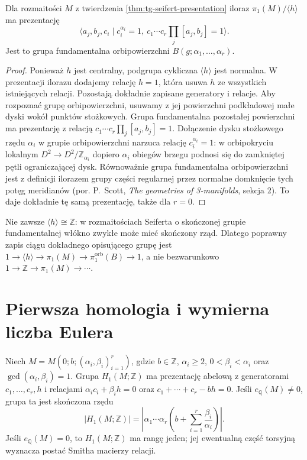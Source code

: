 \begin{wniosek}
Dla rozmaitości $M$ z twierdzenia
\ref{thm:tg-seifert-presentation} iloraz
$\pi_1(M)/\langle h\rangle$ ma prezentację
\[
\big\langle a_j,b_j,c_i\mid c_i^{\alpha_i}=1,
\ c_1\cdots c_r\prod_j[a_j,b_j]=1\big\rangle.
\]
Jest to grupa fundamentalna orbipowierzchni
$B(g;\alpha_1,\ldots,\alpha_r)$.
\end{wniosek}
\begin{proof}
Ponieważ $h$ jest centralny, podgrupa cykliczna
$\langle h\rangle$ jest normalna. W prezentacji
ilorazu dodajemy relację $h=1$, która usuwa $h$
ze wszystkich istniejących relacji. Pozostają dokładnie
zapisane generatory i relacje. Aby rozpoznać
grupę orbipowierzchni, usuwamy z jej powierzchni
podkładowej małe dyski wokół punktów stożkowych.
Grupa fundamentalna pozostałej powierzchni ma
prezentację z relacją
$c_1\cdots c_r\prod_j[a_j,b_j]=1$.
Dołączenie dysku stożkowego rzędu $\alpha_i$
w grupie orbipowierzchni narzuca relację
$c_i^{\alpha_i}=1$: w orbipokryciu lokalnym
$D^2\to D^2/\mathbb Z_{\alpha_i}$ dopiero
$\alpha_i$ obiegów brzegu podnosi się do
zamkniętej pętli ograniczającej dysk.
Równoważnie grupa fundamentalna orbipowierzchni
jest z definicji ilorazem grupy części regularnej
przez normalne domknięcie tych potęg meridianów
(por. P.~Scott, \emph{The geometries of 3-manifolds},
sekcja 2). To daje dokładnie tę samą prezentację,
także dla $r=0$.
\end{proof}

\begin{uwaga}
Nie zawsze $\langle h\rangle\cong\mathbb Z$:
w rozmaitościach Seiferta o skończonej grupie fundamentalnej
włókno zwykłe może mieć skończony rząd. Dlatego poprawny
zapis ciągu dokładnego opisującego grupę jest
$1\to\langle h\rangle\to\pi_1(M)\to
\pi_1^{\mathrm{orb}}(B)\to1$,
a nie bezwarunkowo $1\to\mathbb Z\to\pi_1(M)\to\cdots$.
\end{uwaga}

\section{Pierwsza homologia i wymierna liczba Eulera}
\label{sec:tg-seifert-homology}

\begin{twierdzenie}
\label{thm:tg-seifert-h1}
Niech $M=M(0;b;(\alpha_i,\beta_i)_{i=1}^r)$,
gdzie $b\in\mathbb Z$, $\alpha_i\ge2$,
$0<\beta_i<\alpha_i$ oraz $\gcd(\alpha_i,\beta_i)=1$.
Grupa $H_1(M;\mathbb Z)$ ma prezentację abelową
z generatorami $c_1,\ldots,c_r,h$ i relacjami
$\alpha_ic_i+\beta_ih=0$ oraz
$c_1+\cdots+c_r-bh=0$.
Jeśli $e_{\mathbb Q}(M)\ne0$, grupa ta jest skończona
rzędu
\[
|H_1(M;\mathbb Z)|=
\left|\alpha_1\cdots\alpha_r
\left(b+\sum_{i=1}^r\frac{\beta_i}{\alpha_i}\right)\right|.
\]
Jeśli $e_{\mathbb Q}(M)=0$, to $H_1(M;\mathbb Z)$ ma
rangę jeden; jej ewentualną część torsyjną wyznacza
postać Smitha macierzy relacji.
\end{twierdzenie}

